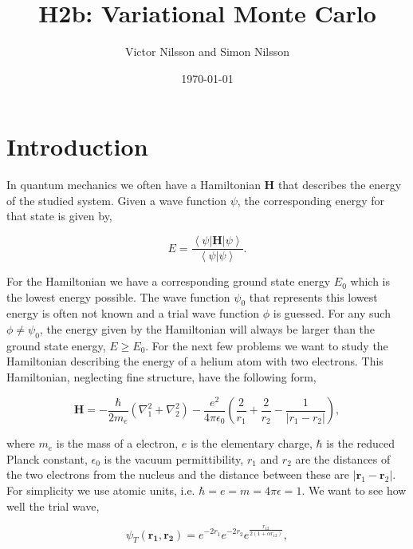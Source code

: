 



\title{H2b: Variational Monte Carlo}
\author{Victor Nilsson and Simon Nilsson}
\date{\today}





\section*{Introduction}

In quantum mechanics we often have a Hamiltonian $\mathbf{H}$ that describes the energy of the studied system. Given a wave function $\psi$, the corresponding energy for that state is given by,

\begin{equation}
E=\frac{\left<\psi|\mathbf{H}|\psi\right>}{\left<\psi|\psi\right>}.
\end{equation}

For the Hamiltonian we have a corresponding ground state energy $E_0$ which is the lowest energy possible. The wave function $\psi_0$ that represents this lowest energy is often not known and a trial wave function $\phi$ is guessed. For any such $\phi \neq \psi_0$, the energy given by the Hamiltonian will always be larger than the ground state energy, $E \geq E_0$. For the next few problems we want to study the Hamiltonian describing the energy of a helium atom with two electrons. This Hamiltonian, neglecting fine structure, have the following form,

\begin{equation}
\mathbf{H}=-\frac{\hbar}{2m_e}\left(\nabla_1^2+\nabla_2^2\right)-\frac{e^2}{4\pi \epsilon_0}\left(\frac{2}{r_1}+\frac{2}{r_2}-\frac{1}{|r_1-r_2|}\right),
\end{equation} 

where $m_e$ is the mass of a electron, $e$ is the elementary charge, $\hbar$ is the reduced Planck constant, $\epsilon_0$ is the vacuum permittibility, $r_1$ and $r_2$ are the distances of the two electrons from the nucleus and the distance between these are $|\mathbf{r}_1-\mathbf{r}_2|$. For simplicity we use atomic units, i.e. $\hbar=e=m=4\pi\epsilon=1$. We want to see how well the trial wave,

\begin{equation}
\psi_T(\mathbf{r_1},\mathbf{r_2})=e^{-2r_1}e^{-2r_2}e^{\frac{r_{12}}{2(1+\alpha r_{12})}},
\end{equation}

